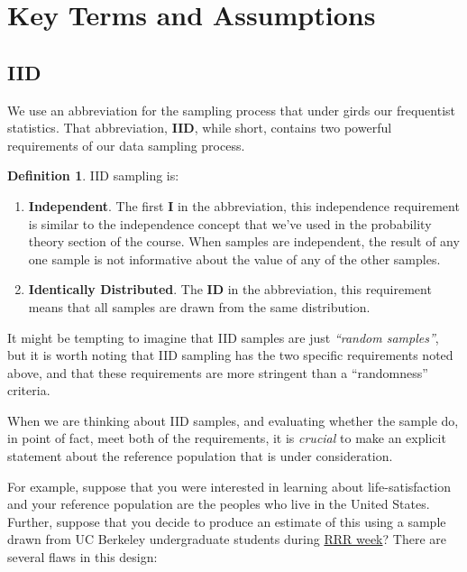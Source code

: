 \documentclass[
]{book}
\providecommand{\tightlist}{%
  \setlength{\itemsep}{0pt}\setlength{\parskip}{0pt}}
\theoremstyle{definition}
\newtheorem{definition}{Definition}[chapter]
\theoremstyle{definition}
\theoremstyle{definition}
\theoremstyle{definition}
\theoremstyle{remark}
\begin{document}
\section{Key Terms and Assumptions}\label{key-terms-and-assumptions}

\subsection{IID}\label{iid}

We use an abbreviation for the sampling process that under girds our frequentist statistics. That abbreviation, \textbf{IID}, while short, contains two powerful requirements of our data sampling process.

\begin{definition}

IID sampling is:

\begin{enumerate}
\def\labelenumi{\arabic{enumi}.}
\tightlist
\item
  \textbf{Independent}. The first \textbf{I} in the abbreviation, this independence requirement is similar to the independence concept that we've used in the probability theory section of the course. When samples are independent, the result of any one sample is not informative about the value of any of the other samples.
\item
  \textbf{Identically Distributed}. The \textbf{ID} in the abbreviation, this requirement means that all samples are drawn from the same distribution.
\end{enumerate}

\end{definition}

It might be tempting to imagine that IID samples are just \emph{``random samples''}, but it is worth noting that IID sampling has the two specific requirements noted above, and that these requirements are more stringent than a ``randomness'' criteria.

When we are thinking about IID samples, and evaluating whether the sample do, in point of fact, meet both of the requirements, it is \emph{crucial} to make an explicit statement about the reference population that is under consideration.

For example, suppose that you were interested in learning about life-satisfaction and your reference population are the peoples who live in the United States. Further, suppose that you decide to produce an estimate of this using a sample drawn from UC Berkeley undergraduate students during \href{https://teaching.berkeley.edu/sites/default/files/rrr_guidelines.pdf}{RRR week}? There are several flaws in this design:
\end{document}
